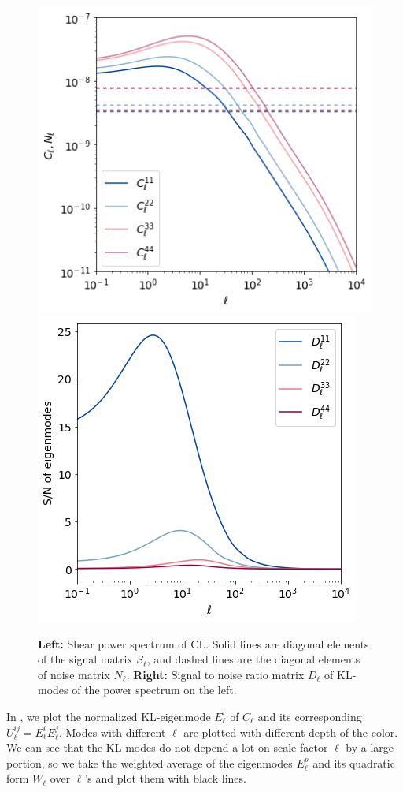 \documentclass[twocolumn]{\docclass}
\begin{document}
	\begin{figure}
		\includegraphics[width=0.7\columnwidth]{Cl_pst.png}
		\qquad \qquad \qquad
		\includegraphics[width=0.7\columnwidth]{Dl_pst.png}
		\caption{\textbf{Left:} Shear power spectrum of CL. Solid lines are diagonal elements of the signal matrix $S_{\ell}$, and dashed lines are the diagonal elements of noise matrix $N_{\ell}$.
			\textbf{Right:} Signal to noise ratio matrix $D_\ell$ of KL-modes of the power spectrum on the left.  \label{fig:ClDl}}
	\end{figure}
	
	In , we plot the normalized KL-eigenmode $E_\ell^i$ of $C_{\ell}$ and its corresponding $U^{ij}_\ell=E_\ell^i E_\ell^j$. Modes with different $\ell$ are plotted with different depth of the color. We can see that the KL-modes do not depend a lot on scale factor $\ell$ by a large portion, so we take the weighted average of the eigenmodes $E_\ell^p$ and its quadratic form $W_\ell$ over $\ell$'s and plot them with black lines. 
	
\end{document}
